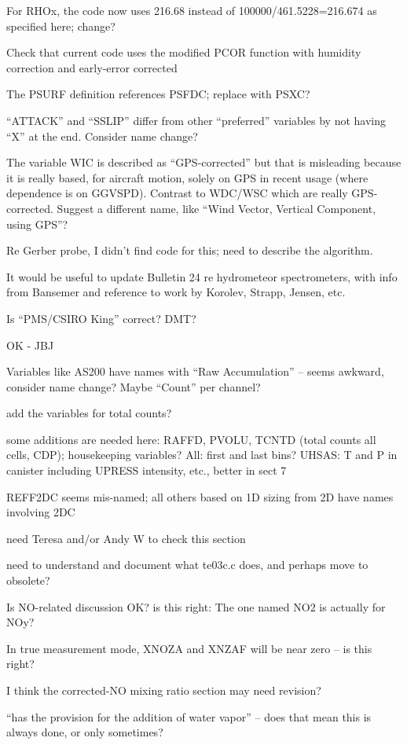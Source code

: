 \documentclass[
  english,
]{book}
\begin{document}
For RHOx, the code now uses 216.68 instead of 100000/461.5228=216.674 as
specified here; change?

Check that current code uses the modified PCOR function with humidity
correction and early-error corrected

The PSURF definition references PSFDC; replace with PSXC?

``ATTACK'' and ``SSLIP'' differ from other ``preferred'' variables by
not having ``X'' at the end. Consider name change?

The variable WIC is described as ``GPS-corrected'' but that is
misleading because it is really based, for aircraft motion, solely on
GPS in recent usage (where dependence is on GGVSPD). Contrast to WDC/WSC
which are really GPS-corrected. Suggest a different name, like ``Wind
Vector, Vertical Component, using GPS''?

Re Gerber probe, I didn't find code for this; need to describe the
algorithm.

It would be useful to update Bulletin 24 re hydrometeor spectrometers,
with info from Bansemer and reference to work by Korolev, Strapp,
Jensen, etc.

Is ``PMS/CSIRO King'' correct? DMT?

OK - JBJ

Variables like AS200 have names with ``Raw Accumulation'' -- seems
awkward, consider name change? Maybe ``Count'' per channel?

add the variables for total counts?

some additions are needed here: RAFFD, PVOLU, TCNTD (total counts all
cells, CDP); housekeeping variables? All: first and last bins? UHSAS: T
and P in canister including UPRESS intensity, etc., better in sect 7

REFF2DC seems mis-named; all others based on 1D sizing from 2D have
names involving 2DC

need Teresa and/or Andy W to check this section

need to understand and document what te03c.c does, and perhaps move to
obsolete?

Is NO-related discussion OK? is this right: The one named NO2 is
actually for NOy?

In true measurement mode, XNOZA and XNZAF will be near zero -- is this
right?

I think the corrected-NO mixing ratio section may need revision?

``has the provision for the addition of water vapor'' -- does that mean
this is always done, or only sometimes?
\end{document}
